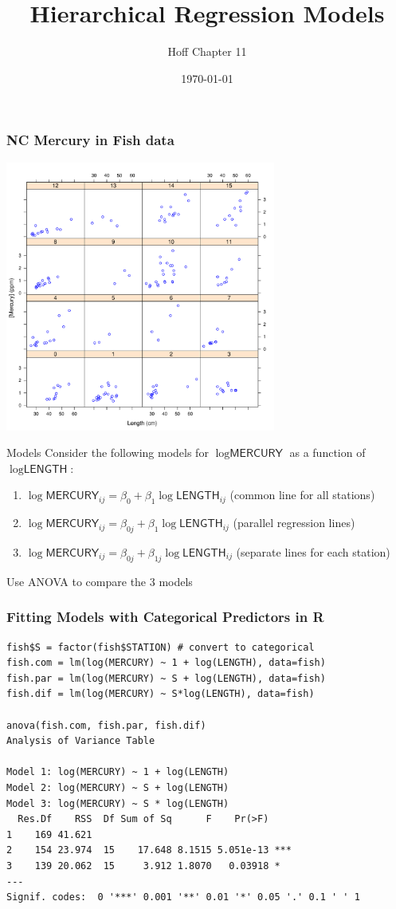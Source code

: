 \documentclass[]{beamer}
\title{Hierarchical Regression Models}
\author{Hoff Chapter 11}
\date{\today}
\def\M{\textsf{MERCURY}}
\def\L{\textsf{LENGTH}}
\begin{document}
\maketitle

\begin{frame}\frametitle{NC Mercury in Fish data}
\includegraphics[height=3.5in]{fish-xy-smooth-lattice}
\end{frame}


\begin{frame}{Models}
Consider the following models for $\log{\M}$ as a function of
$\log{\L}$: \pause
\begin{enumerate}
\item  $\log{\M_{ij} = \beta_{0} + \beta_{1}\log \L_{ij}}$  (common
  line for all stations)  \pause
\item $\log{\M_{ij} = \beta_{0j} + \beta_{1}\log \L_{ij}}$  (parallel
  regression lines)  \pause

\item $\log{\M_{ij} = \beta_{0j} + \beta_{1j}\log \L_{ij}}$ (separate
  lines for each station)  \pause
\end{enumerate}
\vspace{.2in}
Use ANOVA to compare the 3 models
\end{frame}

\begin{frame}[fragile]
\frametitle{Fitting Models with Categorical Predictors in R}

\begin{verbatim}
fish$S = factor(fish$STATION) # convert to categorical
fish.com = lm(log(MERCURY) ~ 1 + log(LENGTH), data=fish)
fish.par = lm(log(MERCURY) ~ S + log(LENGTH), data=fish)
fish.dif = lm(log(MERCURY) ~ S*log(LENGTH), data=fish)
 
anova(fish.com, fish.par, fish.dif)
Analysis of Variance Table

Model 1: log(MERCURY) ~ 1 + log(LENGTH)
Model 2: log(MERCURY) ~ S + log(LENGTH)
Model 3: log(MERCURY) ~ S * log(LENGTH)
  Res.Df    RSS  Df Sum of Sq      F    Pr(>F)    
1    169 41.621                                   
2    154 23.974  15    17.648 8.1515 5.051e-13 ***
3    139 20.062  15     3.912 1.8070   0.03918 *  
---
Signif. codes:  0 '***' 0.001 '**' 0.01 '*' 0.05 '.' 0.1 ' ' 1 
\end{verbatim}
\end{frame}
\end{document}
